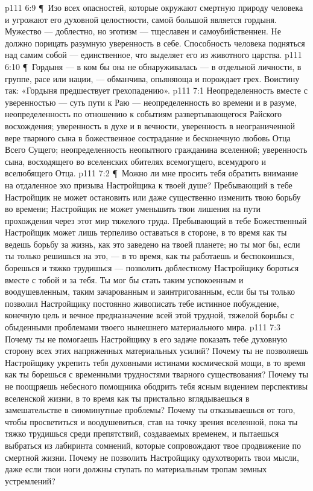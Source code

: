 \vs p111 6:9 \P\ Изо всех опасностей, которые окружают смертную природу человека и угрожают его духовной целостности, самой большой является гордыня. Мужество --- доблестно, но эготизм --- тщеславен и самоубийственнен. Не должно порицать разумную уверенность в себе. Способность человека подняться над самим собой --- единственное, что выделяет его из животного царства.
\vs p111 6:10 \P\ Гордыня --- в ком бы она не обнаруживалась --- в отдельной личности, в группе, расе или нации, --- обманчива, опьяняюща и порождает грех. Воистину так: «Гордыня предшествует грехопадению».
\vs p111 7:1 Неопределенность вместе с уверенностью --- суть пути к Раю --- неопределенность во времени и в разуме, неопределенность по отношению к событиям развертывающегося Райского восхождения; уверенность в духе и в вечности, уверенность в неограниченной вере тварного сына в божественное сострадание и бесконечную любовь Отца Всего Сущего; неопределенность неопытного гражданина вселенной; уверенность сына, восходящего во вселенских обителях всемогущего, всемудрого и вселюбящего Отца.
\vs p111 7:2 \P\ Можно ли мне просить тебя обратить внимание на отдаленное эхо призыва Настройщика к твоей душе? Пребывающий в тебе Настройщик не может остановить или даже существенно изменить твою борьбу во времени; Настройщик не может уменьшить твои лишения на пути прохождения через этот мир тяжелого труда. Пребывающий в тебе Божественный Настройщик может лишь терпеливо оставаться в стороне, в то время как ты ведешь борьбу за жизнь, как это заведено на твоей планете; но ты мог бы, если ты только решишься на это, --- в то время, как ты работаешь и беспокоишься, борешься и тяжко трудишься --- позволить доблестному Настройщику бороться вместе с тобой и за тебя. Ты мог бы стать таким успокоенным и воодушевленным, таким зачарованным и заинтригованным, если бы ты только позволил Настройщику постоянно живописать тебе истинное побуждение, конечную цель и вечное предназначение всей этой трудной, тяжелой борьбы с обыденными проблемами твоего нынешнего материального мира.
\vs p111 7:3 Почему ты не помогаешь Настройщику в его задаче показать тебе духовную сторону всех этих напряженных материальных усилий? Почему ты не позволяешь Настройщику укрепить тебя духовными истинами космической мощи, в то время как ты борешься с временными трудностями тварного существования? Почему ты не поощряешь небесного помощника ободрить тебя ясным видением перспективы вселенской жизни, в то время как ты пристально вглядываешься в замешательстве в сиюминутные проблемы? Почему ты отказываешься от того, чтобы просветиться и воодушевиться, став на точку зрения вселенной, пока ты тяжко трудишься среди препятствий, создаваемых временем, и пытаешься выбраться из лабиринта сомнений, которые сопровождают твое продвижение по смертной жизни. Почему не позволить Настройщику одухотворить твои мысли, даже если твои ноги должны ступать по материальным тропам земных устремлений?

